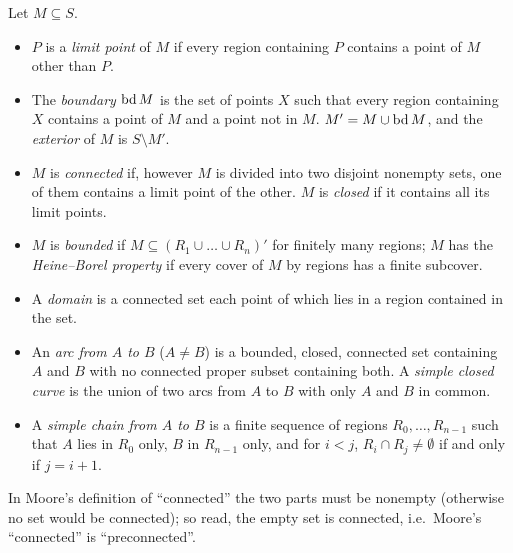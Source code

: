 \begin{definition}\label{def:moore-notions}
Let $M\subseteq S$.
\begin{itemize}
\item $P$ is a \emph{limit point} of $M$ if every region containing $P$ contains a point of $M$
other than $P$.
\item The \emph{boundary} $\operatorname{bd} M$ is the set of points $X$ such that every region containing $X$
contains a point of $M$ and a point not in $M$. $M'=M\cup\operatorname{bd} M$, and the \emph{exterior} of $M$ is
$S\setminus M'$.
\item $M$ is \emph{connected} if, however $M$ is divided into two disjoint nonempty sets, one of them
contains a limit point of the other. $M$ is \emph{closed} if it contains all its limit points.
\item $M$ is \emph{bounded} if $M\subseteq(R_1\cup\dots\cup R_n)'$ for finitely many regions; $M$ has
the \emph{Heine--Borel property} if every cover of $M$ by regions has a finite subcover.
\item A \emph{domain} is a connected set each point of which lies in a region contained in the set.
\item An \emph{arc from $A$ to $B$} ($A\ne B$) is a bounded, closed, connected set containing $A$ and
$B$ with no connected proper subset containing both. A \emph{simple closed curve} is the union of two
arcs from $A$ to $B$ with only $A$ and $B$ in common.
\item A \emph{simple chain from $A$ to $B$} is a finite sequence of regions $R_0,\dots,R_{n-1}$ such
that $A$ lies in $R_0$ only, $B$ in $R_{n-1}$ only, and for $i<j$, $R_i\cap R_j\ne\emptyset$ if and only
if $j=i+1$.
\end{itemize}
\end{definition}


In Moore's definition of ``connected'' the two parts must be nonempty (otherwise no set would be
connected); so read, the empty set is connected, i.e.\ Moore's ``connected'' is ``preconnected''.

